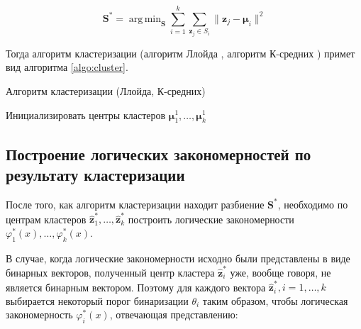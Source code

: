 \documentclass[12pt]{article}
\DeclareMathOperator*{\argmin}{arg\,min}
\begin{document}
\begin{equation}\label{eq:quality}
\bm{S}^* =
\argmin_{\bm{S}}
\sum_{i=1}^k \sum_{\bm{z}_j\in S_i} \|\bm{z}_j - \bm{\mu}_i\|^2
\end{equation}

Тогда алгоритм кластеризации
(алгоритм Ллойда \cite{lloyd06}, алгоритм К-средних \cite{macqueen67})
примет вид алгоритма \ref{algo:cluster}.

\begin{algorithm}[!htpb]
  \caption{Алгоритм кластеризации (Ллойда, К-средних)}
  \label{algo:cluster}
   {
    Инициализировать центры кластеров
    \(\bm{\mu}_1^1, \dots, \bm{\mu}_k^1\)\;
    \;
  }
\end{algorithm}

\subsection{Построение логических закономерностей по результату кластеризации}
После того, как алгоритм кластеризации находит разбиение
\(\bm{S}^*\), необходимо по центрам кластеров
\(\bm{\hat{z}}_1^*, \dots, \bm{\hat{z}}_k^*\)
построить логические закономерности
\(\varphi_1^*(x), \dots, \varphi_k^*(x)\).

В случае, когда логические закономерности исходно были представлены в
виде бинарных векторов, полученный центр кластера \(\bm{\hat{z}}_i^*\)
уже, вообще говоря, не является бинарным вектором. Поэтому для каждого
вектора \(\bm{\hat{z}}^*_i, i = 1,\dots, k\) выбирается некоторый порог
бинаризации \(\theta_i\) таким образом, чтобы логическая закономерность
\(\varphi_i^*(x)\), отвечающая представлению:
\end{document}
